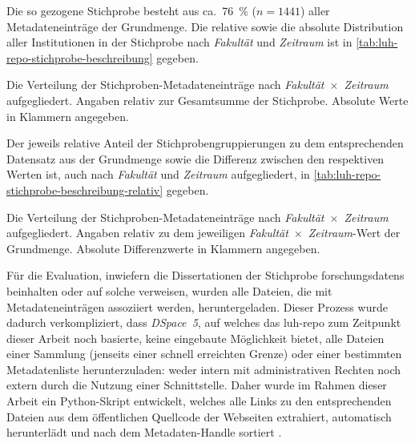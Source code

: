 Die so gezogene Stichprobe besteht aus ca.~\SI[round-mode=places,round-precision=2]{76}{\percent} ($n=1441$) aller Metadateneinträge der Grundmenge.
Die relative sowie die absolute Distribution aller Institutionen in der Stichprobe nach \textit{Fakultät} und \textit{Zeitraum} ist in \cref{tab:luh-repo-stichprobe-beschreibung} gegeben.
\begin{table}[!htbp]
	\caption{Die Verteilung der Stichproben-Metadateneinträge nach \textit{Fakultät}~$\times$~\textit{Zeitraum} aufgegliedert.
    Angaben relativ zur Gesamtsumme der Stichprobe.
    Absolute Werte in Klammern angegeben.}
    
	\label{tab:luh-repo-stichprobe-beschreibung}
\end{table}
Der jeweils relative Anteil der Stichprobengruppierungen zu dem entsprechenden Datensatz aus der Grundmenge sowie die Differenz zwischen den respektiven Werten ist, auch nach \textit{Fakultät} und \textit{Zeitraum} aufgegliedert, in \cref{tab:luh-repo-stichprobe-beschreibung-relativ} gegeben.
\begin{table}[!htbp]
	\caption{Die Verteilung der Stichproben-Metadateneinträge nach \textit{Fakultät}~$\times$~\textit{Zeitraum} aufgegliedert.
    Angaben relativ zu dem jeweiligen \textit{Fakultät}~$\times$~\textit{Zeitraum}-Wert der Grundmenge.
    Absolute Differenzwerte in Klammern angegeben.}
    
	\label{tab:luh-repo-stichprobe-beschreibung-relativ}
\end{table}

Für die Evaluation, inwiefern die Dissertationen der Stichprobe \glspl{forschungsdaten} beinhalten oder auf solche verweisen, wurden alle Dateien, die mit Metadateneinträgen assoziiert werden, heruntergeladen.
Dieser Prozess wurde dadurch verkompliziert, dass \textit{DSpace~5}, auf welches das \gls{luh-repo} zum Zeitpunkt dieser Arbeit noch basierte, keine eingebaute Möglichkeit bietet, alle Dateien einer Sammlung (jenseits einer schnell erreichten Grenze) oder einer bestimmten Metadatenliste herunterzuladen:
weder intern mit administrativen Rechten noch extern durch die Nutzung einer Schnittstelle.
Daher wurde im Rahmen dieser Arbeit ein Python-Skript entwickelt, welches alle Links zu den entsprechenden Dateien aus dem öffentlichen Quellcode der Webseiten extrahiert, automatisch herunterlädt und nach dem Metadaten-Handle sortiert \autocite{Krassnig2024-dspace}.

